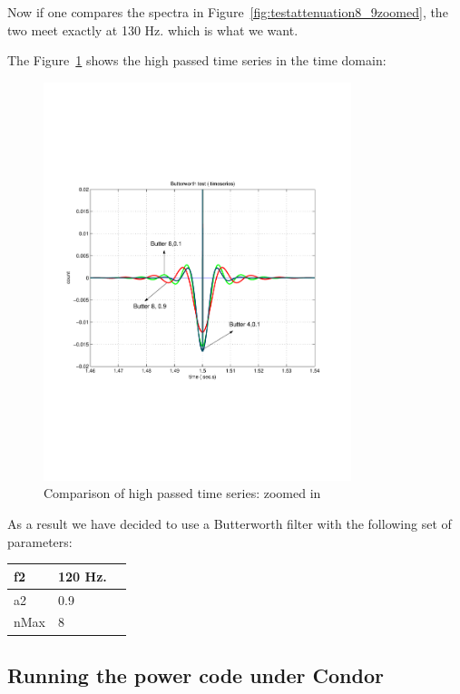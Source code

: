 Now if one compares the spectra in Figure~\ref{fig:testattenuation8_9zoomed},
the two meet exactly at 130 Hz. which is what we want. 

The Figure~\ref{fig:butter894comptimeseries} shows the high passed time series 
in the time domain:
\begin{figure}
\centering
\includegraphics[width=0.8\textwidth]{figures/butter894comptimeseries}
\caption{Comparison of high passed time series: zoomed in} \label{fig:butter894comptimeseries}
\end{figure}

As a result we have decided to use a Butterworth filter with the following 
set of parameters:

\begin{tabular}{|l|l|r|} \hline
  f2  & 120 Hz. \\ \hline
  a2  & 0.9     \\ \hline
  nMax  & 8     \\ \hline
\end{tabular} \label{tab:butterfinal}

\clearpage


\subsection{Running the power code under Condor}
\label{subsection:running_power}

